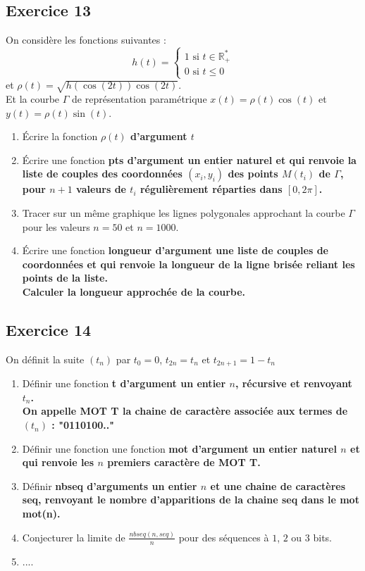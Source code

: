 \documentclass[10pt,fleqn]{article} %
\begin{document}
\begin{multicols}{2}
\subsection*{Exercice 13}
On considère les fonctions suivantes : 
$$h(t)=\left\{
 \begin{array}{l} 
 1  \text{ si } t \in \mathbb{R}_{+}^{*} \\ 
 0  \text{ si } t\leq 0
\end{array}\right.
$$
et 
$\rho(t)=\sqrt{h(\cos(2t))\cos(2t)}$.\\
Et la courbe $\Gamma$ de représentation paramétrique 
$x(t)=\rho(t)\cos(t)$ et $y(t)=\rho(t)\sin(t)$.
\begin{enumerate}
\item Écrire la fonction \bf $\rho(t)$ \rm d'argument $t$
\item Écrire une fonction \bf pts \rm d'argument un entier naturel et qui renvoie la liste 
de couples des coordonnées $(x_i,y_i)$ des points $M(t_i)$ de $\Gamma$, pour 
$n+1$ valeurs de $t_i$ régulièrement réparties dans $[0,2\pi]$.
\item Tracer sur un même graphique les lignes polygonales approchant la courbe
 $\Gamma$ pour les valeurs $n=50$ et $n=1000$.
\item Écrire une fonction \bf longueur \rm d'argument une liste de couples de
 coordonnées et qui renvoie la longueur de la ligne brisée reliant les points de la liste.\\
 Calculer la longueur approchée de la courbe.
\end{enumerate}

\subsection*{Exercice 14}
On définit la suite $(t_n)$ par $t_0=0$, $t_{2n}=t_n$ et $t_{2n+1}=1-t_n$
\begin{enumerate}
\item Définir  une fonction \bf t \rm d'argument un entier $n$, récursive et renvoyant 
$t_n$.\\
On appelle MOT T la chaine de caractère associée aux termes de $(t_n)$ : "0110100.."
\item Définir une fonction une fonction \bf mot \rm d'argument un entier naturel $n$ 
et qui renvoie les $n$ premiers caractère de MOT T. 
\item Définir \bf nbseq \rm d'arguments un entier $n$ et une chaine de 
caractères seq, renvoyant le nombre d'apparitions de la chaine seq dans le mot mot(n).
\item Conjecturer la limite de $\frac{nbseq(n,seq)}{n}$  pour des séquences à
$1$, $2$ ou $3$ bits.
\item ....
\end{enumerate}


\end{multicols}
\end{document}

